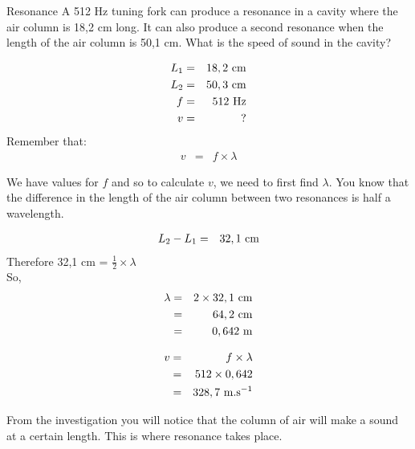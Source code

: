 \begin{wex}{Resonance}
{A 512 Hz tuning fork can produce a resonance in a cavity where the air column is 18,2 cm long. It can also produce
a second resonance when the length of the air column is 50,1 cm. What is the speed of sound in the cavity?}
{
\begin{eqnarray*}
L_{1} &=& 18,2 \ \rm{cm} \\
L_{2} &=& 50,3 \ \rm{cm} \\
f &=& 512 \ \rm{Hz} \\
v &=& ?
\end{eqnarray*}
Remember that:
\begin{eqnarray*}
v &=& f \times \lambda
\end{eqnarray*}

We have values for $f$ and so to calculate $v$, we need to first find $\lambda$.
You know that the difference in the length of the air column between two resonances is half a wavelength.

\begin{eqnarray*}
L_{2} - L_{1} &=& 32,1 \ \rm{cm}
\end{eqnarray*}
Therefore 32,1 cm = $\frac{1}{2}\times \lambda$\\
So,
\begin{eqnarray*}
\lambda &=& 2 \times 32,1 \ \rm{cm} \\
 &=& 64,2 \ \rm{cm} \\
 &=& 0,642 \ \rm{m}
\end{eqnarray*}

\begin{eqnarray*}
v &=& f \times \lambda \\
 &=& 512 \times 0,642 \\
 &=& 328,7 \ \rm{m.s}^{-1}
\end{eqnarray*}
}
\end{wex}

From the investigation you will notice that the column of air will make a sound at a certain length. 
This is where resonance takes place.

